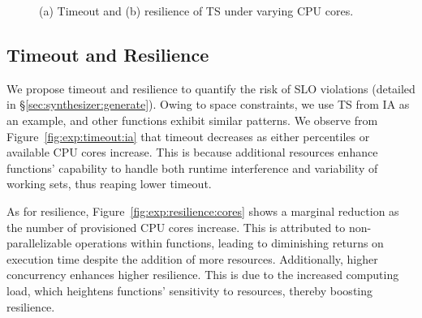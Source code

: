 \begin{figure}[!t]
	\hfill
	\caption{(a) Timeout and (b) resilience of TS under varying CPU cores.}
\end{figure}

\subsection{Timeout and Resilience}
\label{exp:micro:timeout-resilience}
We propose timeout and resilience to quantify the risk of SLO violations (detailed in \S\ref{sec:synthesizer:generate}).
Owing to space constraints, we use TS from IA as an example, and other functions exhibit similar patterns.
We observe from Figure~\ref{fig:exp:timeout:ia} that timeout decreases as either percentiles or available CPU cores increase.
This is because additional resources enhance functions' capability to handle both runtime interference and variability of working sets\cite{socc22-owl}, thus reaping lower timeout.

As for resilience, Figure~\ref{fig:exp:resilience:cores} shows a marginal reduction as the number of provisioned CPU cores increase.
This is attributed to non-parallelizable operations within functions, leading to diminishing returns on execution time despite the addition of more resources.
Additionally, higher concurrency enhances higher resilience.
This is due to the increased computing load, which heightens functions' sensitivity to resources, thereby boosting resilience.


%

